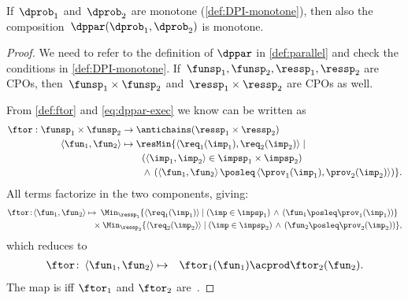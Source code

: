 \begin{proposition}
  \label{pro:dppar-monotone}If~$\dprob_{1}$ and~$\dprob_{2}$ are
  monotone (\cref{def:DPI-monotone}), then also the composition~$\dppar(\dprob_{1},\dprob_{2})$
  is monotone.
\end{proposition}
\begin{proof}
  We need to refer to the definition of $\dppar$ in \cref{def:parallel}
  and check the conditions in \cref{def:DPI-monotone}. If~$\funsp_{1},\funsp_{2},\ressp_{1},\ressp_{2}$
  are CPOs, then~$\funsp_{1}\times\funsp_{2}$ and~$\ressp_{1}\times\ressp_{2}$
  are CPOs as well.

  From \cref{def:ftor} and \cref{eq:dppar-exec} we know \ftor can
  be written as
  \begin{align*}
    \ftor:\funsp_{1}\times\funsp_{2} & \rightarrow\antichains(\ressp_{1}\times\ressp_{2})\\
    \left\langle \fun_{1},\fun_{2}\right\rangle  & \mapsto\resMin\{\left\langle \req_{1}(\imp_{1}),\req_{2}(\imp_{2})\right\rangle \mid\\
    & \qquad\left(\left\langle \imp_{1},\imp_{2}\right\rangle \in\impsp_{1}\times\impsp_{2}\right)\\
    & \qquad\,\wedge\,\left(\left\langle \fun_{1},\fun_{2}\right\rangle \posleq\left\langle \prov_{1}(\imp_{1}),\prov_{2}(\imp_{2})\right\rangle \right)\}.
  \end{align*}
  All terms factorize in the two components, giving:{\small{}
    \begin{align*}
      \ftor\!:\!\left\langle \fun_{1},\fun_{2}\right\rangle \mapsto & \!\!\!\quad\Min_{\ressp_{1}}\{\left\langle \req_{1}(\imp_{1})\right\rangle \mid\left(\imp\in\impsp_{1}\right)\,\wedge\,\left(\fun_{1}\posleq\prov_{1}(\imp_{1})\right)\}\\
      & \!\!\!\times\Min_{\ressp_{2}}\{\left\langle \req_{2}(\imp_{2})\right\rangle \mid\left(\imp\in\impsp_{2}\right)\,\wedge\,\left(\fun_{2}\posleq\prov_{2}(\imp_{2})\right)\},
    \end{align*}
  }which reduces to
  \begin{eqnarray}
    \ftor\colon\left\langle \fun_{1},\fun_{2}\right\rangle  & \mapsto & \ftor_{1}(\fun_{1})\acprod\ftor_{2}(\fun_{2}).\label{eq:isproduct}
  \end{eqnarray}
  The map \ftor is \scottcontinuous iff $\ftor_{1}$ and $\ftor_{2}$
  are~\cite[Lemma II.2.8]{gierz03continuous}.
\end{proof}

